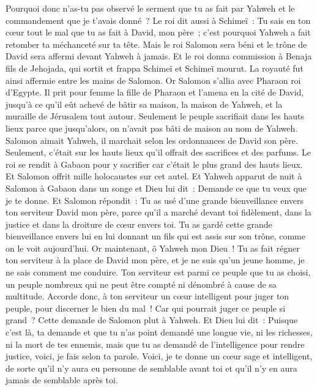 \begin{multicols}{2}
Pourquoi donc n'as-tu pas observé le serment que tu as fait par Yahweh et le commandement que je t'avais donné~?
Le roi dit aussi à Schimeï~: Tu sais en ton cœur tout le mal que tu as fait à David, mon père~; c'est pourquoi Yahweh a fait retomber ta méchanceté sur ta tête.
Mais le roi Salomon sera béni et le trône de David sera affermi devant Yahweh à jamais.
Et le roi donna commission à Benaja fils de Jehojada, qui sortit et frappa Schimeï et Schimeï mourut. La royauté fut ainsi affermie entre les mains de Salomon.
\VerseOne{}Or Salomon s'allia avec Pharaon roi d'Egypte. Il prit pour femme la fille de Pharaon et l'amena en la cité de David, jusqu'à ce qu'il eût achevé de bâtir sa maison, la maison de Yahweh, et la muraille de Jérusalem tout autour.
Seulement le peuple sacrifiait dans les hauts lieux parce que jusqu'alors, on n'avait pas bâti de maison au nom de Yahweh.
Salomon aimait Yahweh, il marchait selon les ordonnances de David son père. Seulement, c'était sur les hauts lieux qu'il offrait des sacrifices et des parfums.
Le roi se rendit à Gabaon pour y sacrifier car c'était le plus grand des hauts lieux. Et Salomon offrit mille holocaustes sur cet autel.
Et Yahweh apparut de nuit à Salomon à Gabaon dans un songe et Dieu lui dit~: Demande ce que tu veux que je te donne.
Et Salomon répondit~: Tu as usé d'une grande bienveillance envers ton serviteur David mon père, parce qu'il a marché devant toi fidèlement, dans la justice et dans la droiture de cœur envers toi. Tu as gardé cette grande bienveillance envers lui en lui donnant un fils qui est assis sur son trône, comme on le voit aujourd'hui.
Or maintenant, ô Yahweh mon Dieu~! Tu as fait régner ton serviteur à la place de David mon père, et je ne suis qu'un jeune homme, je ne sais comment me conduire.
Ton serviteur est parmi ce peuple que tu as choisi, un peuple nombreux qui ne peut être compté ni dénombré à cause de sa multitude.
Accorde donc, à ton serviteur un cœur intelligent pour juger ton peuple, pour discerner le bien du mal~! Car qui pourrait juger ce peuple si grand~?
Cette demande de Salomon plut à Yahweh.
Et Dieu lui dit~: Puisque c'est là, ta demande et que tu n'as point demandé une longue vie, ni les richesses, ni la mort de tes ennemis, mais que tu as demandé de l'intelligence pour rendre justice,
voici, je fais selon ta parole. Voici, je te donne un cœur sage et intelligent, de sorte qu'il n'y aura eu personne de semblable avant toi et qu'il n'y en aura jamais de semblable après toi.

\end{multicols}
